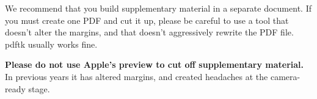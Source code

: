 \documentclass{article}
\begin{document}
We recommend that you build supplementary material in a separate document.
If you must create one PDF and cut it up, please be careful to use a tool that
doesn't alter the margins, and that doesn't aggressively rewrite the PDF file.
pdftk usually works fine. 

\textbf{Please do not use Apple's preview to cut off supplementary material.} In
previous years it has altered margins, and created headaches at the camera-ready
stage. 
\end{document}
